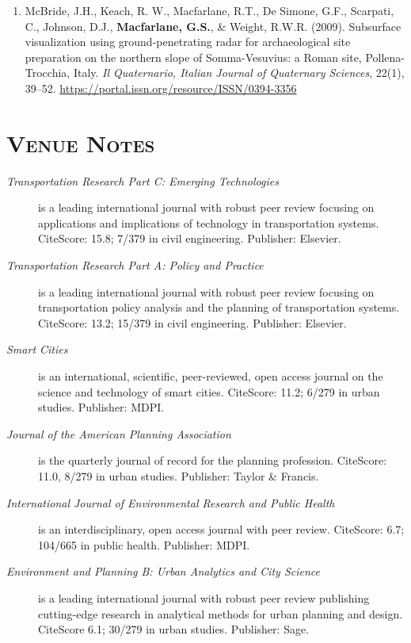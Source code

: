 \documentclass[margin,line]{res}
\newif\ifdetail
\newcounter{enuminitialize}
\newenvironment{myenum}[1][]
{%
 \setcounter{enuminitialize}{#1}
 \addtocounter{enuminitialize}{2}
 \begin{enumerate}[left= 4pt, itemsep=8pt, start=\value{enuminitialize}, label=\arabic*\addtocounter{enumi}{-2}]
}
{%
 \end{enumerate}
}
\newcommand{\secfont}{\scshape }
\begin{document}
\begin{resume}
\begin{myenum}[28]
  \item McBride, J.H., Keach, R. W., Macfarlane, R.T., De Simone, G.F., Scarpati, C.,
Johnson, D.J., \textbf{Macfarlane, G.S.}, \& Weight, R.W.R. (2009). Subsurface visualization using
ground-penetrating radar for archaeological site preparation on the northern
slope of Somma-Vesuvius: a Roman site, Pollena-Trocchia, Italy. \textit{ Il Quaternario,
Italian Journal of Quaternary Sciences}, 22(1), 39–52. \url{https://portal.issn.org/resource/ISSN/0394-3356} \ifdetail Citations: 5  \fi
\end{myenum}

\ifdetail
\section{\secfont{Venue Notes}}
\begin{description}
  \item[\textit{Transportation Research Part C: Emerging Technologies}] is a
  leading international journal with robust peer review focusing on applications
  and implications of technology in transportation systems.
  CiteScore: 15.8; 7/379 in civil engineering. Publisher: Elsevier.
  \item[\textit{Transportation Research Part A: Policy and Practice}] is
   a leading international journal with robust peer review focusing on
   transportation policy  analysis and the planning of transportation systems.
   CiteScore: 13.2; 15/379 in civil engineering. Publisher: Elsevier.
  \item[\textit{Smart Cities}] is an international, scientific, peer-reviewed,
  open access journal on the science and technology of smart cities. CiteScore:
  11.2; 6/279 in urban studies. Publisher: MDPI.
  \item[\textit{Journal of the American Planning Association}] is the quarterly
  journal of record for the planning profession. CiteScore: 11.0, 8/279 in urban studies. 
  Publisher: Taylor \& Francis.
  \item[\textit{International Journal of Environmental Research and Public Health}]
  is an interdisciplinary, open access journal with peer review. CiteScore: 6.7;
  104/665 in public health. Publisher: MDPI.
  \item[\textit{Environment and Planning B: Urban Analytics and City Science}]
  is a leading international journal with robust peer review publishing
  cutting-edge research in analytical methods for urban planning and
  design. CiteScore 6.1; 30/279 in urban studies. Publisher: Sage.

\end{description}
\end{resume}
\end{document}
